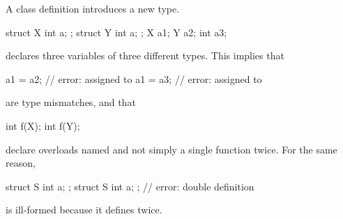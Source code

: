 \pnum
A class definition introduces a new type.
\begin{example}
\begin{codeblock}
struct X { int a; };
struct Y { int a; };
X a1;
Y a2;
int a3;
\end{codeblock}
declares three variables of three different types. This implies that
\begin{codeblock}
a1 = a2;                        // error:  assigned to 
a1 = a3;                        // error:  assigned to 
\end{codeblock}
are type mismatches, and that
\begin{codeblock}
int f(X);
int f(Y);
\end{codeblock}
%
declare overloads named  and not
simply a single function  twice. For the same reason,
\begin{codeblock}
struct S { int a; };
struct S { int a; };            // error: double definition
\end{codeblock}
is ill-formed because it defines  twice.
\end{example}

